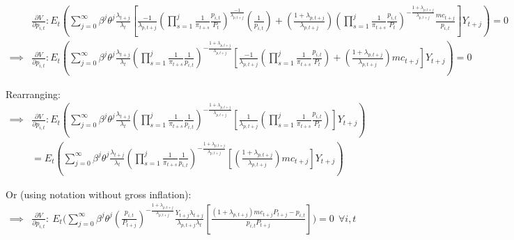 \begin{equation}
\begin{split}
 & \frac{\partial V}{\partial p_{i,t}}: E_{t}\left(\sum_{j=0}^{\infty} \beta^{j}\theta^{j}\frac{\lambda_{t+j}}{\lambda_{t}}\left[\frac{-1}{\lambda_{p,t+j}}\left(\prod_{s=1}^{j}\frac{1}{\pi_{t+s}}\frac{p_{i,t}}{P_{t}}\right)^{\frac{-1}{\lambda_{p,t+j}}}\left(\frac{1}{p_{i,t}}\right)+\left(\frac{1+\lambda_{p,t+j}}{\lambda_{p,t+j}}\right)\left(\prod_{s=1}^{j}\frac{1}{\pi_{t+s}}\frac{p_{i,t}}{P_{t}}\right)^{-\frac{1+\lambda_{p,t+j}}{\lambda_{p,t+j}}}\frac{mc_{t+j}}{p_{i,t}}\right]Y_{t+j}\right)=0 \\
\implies & \frac{\partial V}{\partial p_{i,t}}: E_{t}\left(\sum_{j=0}^{\infty} \beta^{j}\theta^{j}\frac{\lambda_{t+j}}{\lambda_{t}}\left(\prod_{s=1}^{j}\frac{1}{\pi_{t+s}}\frac{1}{p_{i,t}}\right)^{-\frac{1+\lambda_{p,t+j}}{\lambda_{p,t+j}}}\left[\frac{-1}{\lambda_{p,t+j}}\left(\prod_{s=1}^{j}\frac{1}{\pi_{t+s}}\frac{p_{i,t}}{P_{t}}\right)+\left(\frac{1+\lambda_{p,t+j}}{\lambda_{p,t+j}}\right)mc_{t+j}\right]Y_{t+j}\right)=0
\end{split}
\end{equation}

Rearranging:
\begin{equation}
\begin{split}
\implies & \frac{\partial V}{\partial p_{i,t}}: E_{t}  \left(\sum_{j=0}^{\infty} \beta^{j}\theta^{j}\frac{\lambda_{t+j}}{\lambda_{t}}\left(\prod_{s=1}^{j}\frac{1}{\pi_{t+s}}\frac{1}{p_{i,t}}\right)^{-\frac{1+\lambda_{p,t+j}}{\lambda_{p,t+j}}}\left[\frac{1}{\lambda_{p,t+j}}\left(\prod_{s=1}^{j}\frac{1}{\pi_{t+s}}\frac{p_{i,t}}{P_{t}}\right)\right]Y_{t+j}\right) \\
& = E_{t}  \left(\sum_{j=0}^{\infty} \beta^{j}\theta^{j}\frac{\lambda_{t+j}}{\lambda_{t}}\left(\prod_{s=1}^{j}\frac{1}{\pi_{t+s}}\frac{1}{p_{i,t}}\right)^{-\frac{1+\lambda_{p,t+j}}{\lambda_{p,t+j}}}\left[\left(\frac{1+\lambda_{p,t+j}}{\lambda_{p,t+j}}\right)mc_{t+j}\right]Y_{t+j}\right)
\end{split}
\end{equation}


Or (using notation without gross inflation):
\begin{equation}
\begin{split}
\implies  &  \frac{\partial V}{\partial p_{i,t}}:\: E_{t}\Biggl(\sum_{j=0}^{\infty}\beta^{j}\theta^{j}\left(\frac{p_{i,t}}{P_{t+j}}\right)^{-\frac{1+\lambda_{p,t+j}}{\lambda_{p,t+j}}}\frac{Y_{t+j}\lambda_{t+j}}{\lambda_{p,t+j}\lambda_{t}}\left[\frac{(1+\lambda_{p,t+j})mc_{t+j}P_{t+j} - p_{i,t}}{p_{i,t}P_{t+j}}\right]\Biggr) = 0 \ \ \forall i,t
\end{split}
\end{equation}

